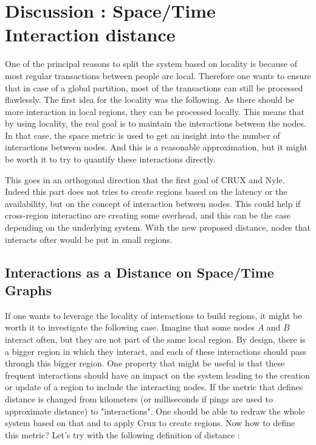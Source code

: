 \documentclass[a4paper,11pt,twoside=semi,openright]{report}
\begin{document}
\section{Discussion : Space/Time Interaction distance}
One of the principal reasons to split the system based on locality is
because of most regular transactions between people are local. Therefore one
wants to ensure that in case of a global partition, most of the transactions
can still be processed flawlessly. The first idea for the locality was the
following. As there should be more interaction in local regions, they can be processed locally. This means that by using locality, the
real goal is to maintain the interactions between the nodes. In that case,
the space metric is used to get an insight into the number of interactions
between nodes. And this is a reasonable approximation, but it might be worth it
to try to quantify these interactions directly. 

This goes in an orthogonal direction that the first goal of CRUX and Nyle. Indeed this part does not tries to create regions based on the latency or the availability, but on the concept of interaction between nodes. This could help if cross-region interactino are creating some overhead, and this can be the case depending on the underlying system. With the new proposed distance, nodes that interacts ofter would be put in small regions.

\subsection{Interactions as a Distance on Space/Time Graphs}

If one wants to leverage the locality of interactions to build regions, it
might be worth it to investigate the following case. Imagine that some nodes
$A$ and $B$ interact often, but they are not part of the same local
region. By design, there is a bigger region in which they interact, and each of
these interactions should pass through this bigger region. One property that might
be useful is that these frequent interactions should have an impact on the
system leading to the creation or update of a region to include the interacting nodes. If the
metric that defines distance is changed from kilometers (or milliseconds if pings are used to approximate distance) to "interactions". One
should be able to redraw the whole system based on that and to apply Crux to
create regions. Now how to define this metric? Let's try with the
following definition of distance :
\end{document}
